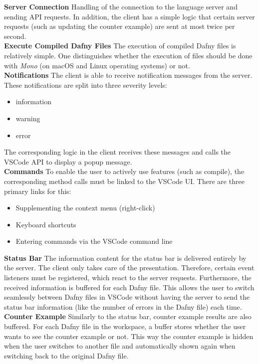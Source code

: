 {\bf Server Connection} \textendash{}
Handling of the connection to the language server and sending API requests.
In addition, the client has a simple logic that certain server requests (such as updating the counter example)
are sent at most twice per second. \\

{\bf Execute Compiled Dafny Files} \textendash{}
The execution of compiled Dafny files is relatively simple.
One distinguishes whether the execution of  files should be done with \textit{Mono} (on macOS and Linux operating systems) or not. \\

{\bf Notifications} \textendash{}
The client is able to receive notification messages from the server.
These notifications are split into three severity levels:
\begin{itemize}
    \item information
    \item warning
    \item error
\end{itemize}
The corresponding logic in the client receives these messages and calls the VSCode API to display a popup message. \\

{\bf Commands} \textendash{}
To enable the user to actively use features (such as compile),
the corresponding method calls must be linked to the VSCode UI.
There are three primary links for this:
\begin{itemize}
    \item Supplementing the context menu (right-click)
    \item Keyboard shortcuts
    \item Entering commands via the VSCode command line
\end{itemize}

{\bf Status Bar} \textendash{}
The information content for the status bar is delivered entirely by the server.
The client only takes care of the presentation.
Therefore, certain event listeners must be registered, which react to the server requests.
Furthermore, the received information is buffered for each Dafny file.
This allows the user to switch seamlessly between Dafny files in VSCode
without having the server to send the status bar information
(like the number of errors in the Dafny file) each time.\\

{\bf Counter Example} \textendash{}
Similarly to the status bar, counter example results are also buffered.
For each Dafny file in the workspace, a buffer stores whether the user wants to see the counter example or not.
This way the counter example is hidden when the user switches to another file
and automatically shown again when switching back to the original Dafny file.

